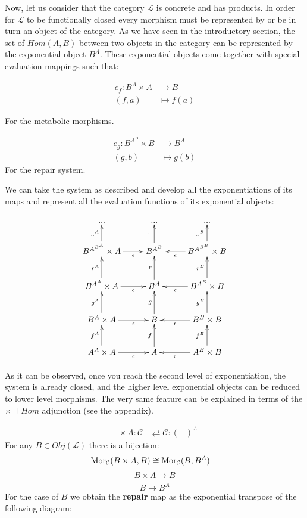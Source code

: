 \documentclass[aps,twocolumn]{revtex4-1}
\begin{document}
Now, let us consider that the category $\mathcal{L}$ is concrete and has products. In order for  $\mathcal{L}$  to be functionally closed every morphism must be represented by or be in turn an object of the category. As we have seen in the introductory section, the set of $Hom(A,B)$ between two objects in the category can be represented by the exponential object $B^A$. These exponential objects come together with special evaluation mappings such that:

\begin{align*}
e_f : B^A \times A &\longrightarrow B\\
(f,a) & \longmapsto f(a)
\end{align*}

For the metabolic morphisms.	
	
\begin{align*}
			e_g: B^{A^B} \times B &\longrightarrow B^A\\
	    			            (g,b) & \longmapsto    g(b)
			\end{align*}		
For the repair system.

 We can take the system as described and develop all the exponentiations of its maps and represent all the evaluation functions of its exponential objects:		

$$
			\xymatrix{
			 ... & ... & ... \\
			  B^{A^{B^A}} \times A \ar[r]_-{\epsilon} \ar[u]^-{..^A} & B^{A^B} \ar[u]^-{..} & B^{A^{B^B}} \times B\ar[l]^-{\epsilon}\ar[u]^-{..^B} \\
			 B^{A^A} \times A \ar[r]_-{\epsilon} \ar[u]^-{r^A} & B^A \ar[u]^-{r} & B^{A^B} \times B\ar[l]^-{\epsilon}\ar[u]^-{r^B} \\
			B^A \times A \ar[r]_-{\epsilon} \ar[u]^-{g^A} & B \ar[u]^-{g} & B^B \times B\ar[l]^-{\epsilon}\ar[u]^-{g^B} \\
			A^A \times A \ar[r]_-{\epsilon} \ar[u]^-{f^A} & 
			A\ar[u]^-{f} & A^B\times B\ar[l]^-{\epsilon}\ar[u]^-{f^B} }
			$$

As it can be observed, once you reach the second level of exponentiation, the system is already closed, and the higher level exponential objects can be reduced to lower level morphisms. The very same feature can be explained in terms of the $\times \dashv Hom$ adjunction (see the appendix). 

\begin{align*}
- \times A: \mathcal{C} & \rightleftarrows \mathcal{C}: (-)^A
\end{align*}
For any $B \in Obj(\mathcal{L})$ there is a bijection:
\begin{align*}
\mathop{\rm Mor}\nolimits_{\mathcal{C}}(B \times A, B) & \cong  \mathop{\rm Mor}\nolimits_{\mathcal{C}}(B, B^A)
\end{align*}
		$$
			\frac{B \times A \longrightarrow B}{B \longrightarrow B^A}
		$$
For the case of $B$ we obtain the \textbf{repair} map as the exponential transpose of the following diagram:
\end{document}
